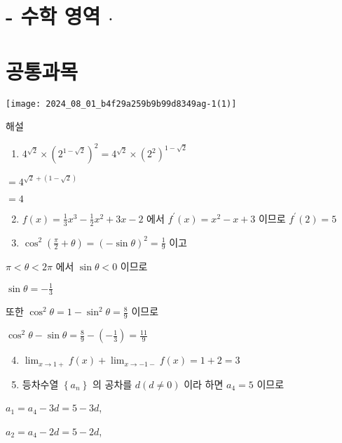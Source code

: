 \documentclass[10pt]{article}
\begin{document}
\section*{- 수학 영역 $\cdot$}
\section*{공통과목}
\begin{center}
\texttt{[image: 2024\_08\_01\_b4f29a259b9b99d8349ag-1(1)]}
\end{center}

해설

\begin{enumerate}
  \item $4^{\sqrt{2}} \times\left(2^{1-\sqrt{2}}\right)^{2}=4^{\sqrt{2}} \times\left(2^{2}\right)^{1-\sqrt{2}}$
\end{enumerate}

$=4^{\sqrt{2}+(1-\sqrt{2})}$

$=4$

\begin{enumerate}
  \setcounter{enumi}{1}
  \item $f(x)=\frac{1}{3} x^{3}-\frac{1}{2} x^{2}+3 x-2$ 에서 $f^{\prime}(x)=x^{2}-x+3$ 이므로 $f^{\prime}(2)=5$

  \item $\cos ^{2}\left(\frac{\pi}{2}+\theta\right)=(-\sin \theta)^{2}=\frac{1}{9}$ 이고

\end{enumerate}

$\pi<\theta<2 \pi$ 에서 $\sin \theta<0$ 이므로

$\sin \theta=-\frac{1}{3}$

또한 $\cos ^{2} \theta=1-\sin ^{2} \theta=\frac{8}{9}$ 이므로

$\cos ^{2} \theta-\sin \theta=\frac{8}{9}-\left(-\frac{1}{3}\right)=\frac{11}{9}$

\begin{enumerate}
  \setcounter{enumi}{3}
  \item $\lim _{x \rightarrow 1+} f(x)+\lim _{x \rightarrow-1-} f(x)=1+2=3$

  \item 등차수열 $\left\{a_{n}\right\}$ 의 공차를 $d(d \neq 0)$ 이라 하면 $a_{4}=5$ 이므로

\end{enumerate}

$a_{1}=a_{4}-3 d=5-3 d$,

$a_{2}=a_{4}-2 d=5-2 d$,
\end{document}
